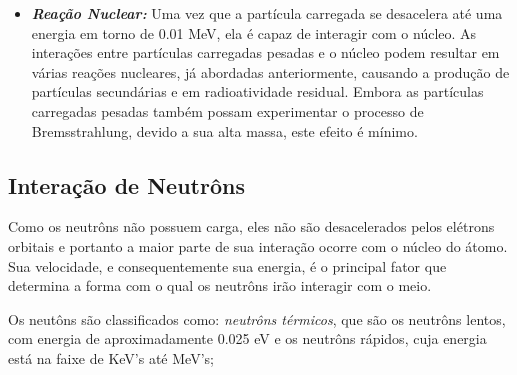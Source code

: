\documentclass[11pt,a4paper]{article}
\begin{document}
\begin{itemize}
                \item \textbf{\textit{\textcolor{CarnationPink}{Reação Nuclear}:}} Uma vez que a partícula carregada se desacelera até uma energia em torno de 0.01 MeV, ela é capaz de interagir com o núcleo. As interações entre partículas carregadas pesadas e o núcleo podem resultar em várias reações nucleares, já abordadas anteriormente, causando a produção de partículas secundárias e em radioatividade residual. Embora as partículas carregadas pesadas também possam experimentar o processo de Bremsstrahlung, devido a sua alta massa, este efeito é mínimo.  
            \end{itemize}

        \subsection{Interação de Neutrôns}

            Como os neutrôns não possuem carga, eles não são desacelerados pelos elétrons orbitais e portanto a maior parte de sua interação ocorre com o núcleo do átomo. Sua velocidade, e consequentemente sua energia, é o principal fator que determina a forma com o qual os neutrôns irão interagir com o meio.

            Os neutôns são classificados como: \textit{\textcolor{CarnationPink}{neutrôns térmicos}}, que são os neutrôns lentos, com energia de aproximadamente 0.025 eV e os neutrôns rápidos, cuja energia está na faixe de KeV's até MeV's;
\end{document}

